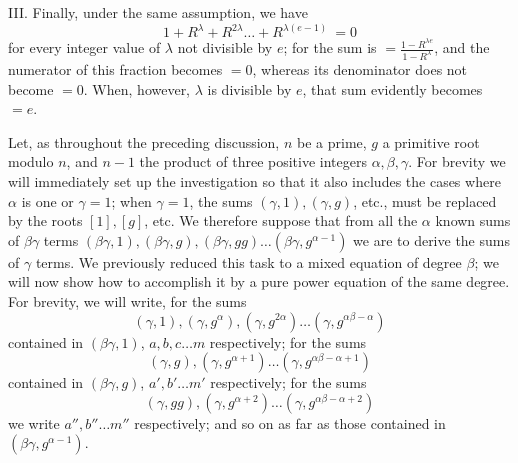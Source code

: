 III. Finally, under the same assumption, we have \[1+R^\lambda+R^{2\lambda}\ldots+R^{\lambda(e-1)}\ =0\] for every integer value of \(\lambda\) not divisible by \(e\); for the sum is \(=\frac{1-R^{\lambda e}}{1-R^\lambda}\), and the numerator of this fraction becomes \(=0\), whereas its denominator does not become \(=0\). When, however, \(\lambda\) is divisible by \(e\), that sum evidently becomes \(=e\).

Let, as throughout the preceding discussion, \(n\) be a prime, \(g\) a primitive root modulo \(n\), and \(n-1\) the product of three positive integers \(\alpha,\allowbreak \beta,\allowbreak \gamma\). For brevity we will immediately set up the investigation so that it also includes the cases where \(\alpha\) is one or \(\gamma=1\); when \(\gamma=1\), the sums \((\gamma,1),\allowbreak (\gamma,g)\), etc., must be replaced by the roots \([1],\allowbreak [g]\), etc. We therefore suppose that from all the \(\alpha\) known sums of \(\beta\gamma\) terms \((\beta\gamma,1),\allowbreak (\beta\gamma,g),\allowbreak (\beta\gamma,gg)\ldots(\beta\gamma,g^{\alpha-1})\) we are to derive the sums of \(\gamma\) terms. We previously reduced this task to a mixed equation of degree \(\beta\); we will now show how to accomplish it by a pure power equation of the same degree. For brevity, we will write, for the sums \[(\gamma,1),(\gamma,g^\alpha),(\gamma,g^{2\alpha})\ldots(\gamma,g^{\alpha\beta-\alpha})\]
contained in \((\beta\gamma,1)\), \(a,\allowbreak b,\allowbreak c\ldots m\) respectively; for the sums \[(\gamma,g),(\gamma,g^{\alpha+1})\ldots(\gamma,g^{\alpha\beta-\alpha+1})\] contained in \((\beta\gamma,g)\), \(a',\allowbreak b'\ldots m'\) respectively; for the sums \[(\gamma,gg),(\gamma,g^{\alpha+2})\ldots(\gamma,g^{\alpha\beta-\alpha+2})\] we write \(a'',\allowbreak b''\ldots m''\) respectively; and so on as far as those contained in \((\beta\gamma,g^{\alpha-1})\).

